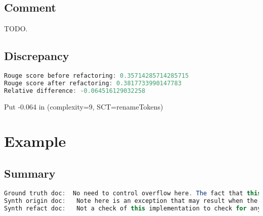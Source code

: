 \documentclass[11pt]{article}
\begin{document}
\subsection{Comment}

TODO.

\subsection{Discrepancy}

\begin{lstlisting}[language=java]
Rouge score before refactoring: 0.35714285714285715
Rouge score after refactoring: 0.3817733990147783
Relative difference: -0.064516129032258
\end{lstlisting}

Put -0.064 in (complexity=9, SCT=renameTokens)

\pagebreak
\section{Example}
\subsection{Summary}

\begin{lstlisting}[language=java]
Ground truth doc:  No need to control overflow here. The fact that this has overflow will be used as a flag to determine
Synth origin doc:   Note here is an exception that may result when the writer checks whether there exist problems or otherwise to
Synth refact doc:   Not a check of this implementation to check for any errors but also it seems useful here as to
\end{lstlisting}
\end{document}
